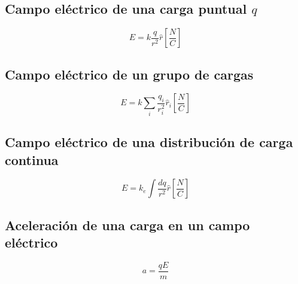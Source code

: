 \documentclass{report}
\begin{document}
    \subsection*{Campo eléctrico de una carga puntual $q$}
      \begin{equation*}
        E=k\frac{q}{r^2}\hat{r}\left[\frac{N}{C}\right]
      \end{equation*}

    \subsection*{Campo eléctrico de un grupo de cargas}
      \begin{equation*}
        E=k\sum_{i}\frac{q_i}{r_i^2}\hat{r}_i\left[\frac{N}{C}\right]
      \end{equation*}

    \subsection*{Campo eléctrico de una distribución de carga continua}
      \begin{equation*}
        E=k_e\int\frac{dq}{r^2}\hat{r}\left[\frac{N}{C}\right]
      \end{equation*}

    \subsection*{Aceleración de una carga en un campo eléctrico}
      \begin{equation*}
        a=\frac{qE}{m}
      \end{equation*}

\end{document}
